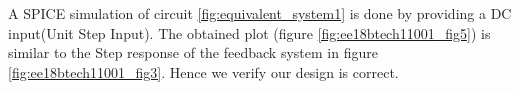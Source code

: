 \begin{enumerate}[label=\thesection.\arabic*.,ref=\thesection.\theenumi]
A SPICE simulation of circuit \ref{fig:equivalent_system1} is done by providing a DC input(Unit Step Input). The obtained plot (figure \ref{fig:ee18btech11001_fig5}) is similar to the Step response of the feedback system in figure \ref{fig:ee18btech11001_fig3}. Hence we verify our design is correct.

\end{enumerate}